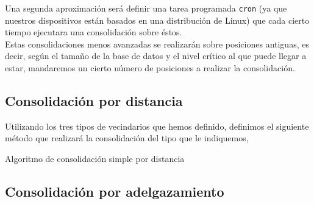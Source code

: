 \documentclass[a4paper, 12pt]{article}
\begin{document}
Una segunda aproximaci\'on ser\'a definir una tarea programada \texttt{cron} (ya que nuestros dispositivos est\'an basados en una distribuci\'on de Linux) que cada cierto tiempo ejecutara una consolidaci\'on sobre \'estos. \\

Estas consolidaciones menos avanzadas se realizar\'an sobre posiciones antiguas, es decir, seg\'un el tama\~no de la base de datos y el nivel cr\'itico al que puede llegar a estar, mandaremos un cierto n\'umero de posiciones a realizar la consolidaci\'on. \\

\pagebreak

\subsection{Consolidaci\'on por distancia}

Utilizando los tres tipos de vecindarios que hemos definido, definimos el siguiente m\'etodo que realizar\'a la consolidaci\'on del tipo que le indiquemos, 


\begin{algorithm}[h]\label{consolidationByDistance}
\begin{algorithmic}[1]
        \Else
        \EndIf
    \EndIf
        \Else
        \EndIf
    \EndIf
        \Else
        \EndIf
    \EndIf
\EndFor
\EndFunction
\end{algorithmic}
\caption{\label{alg:consolidationByDinstace} Algoritmo de consolidaci\'on simple por distancia}
\end{algorithm}

\pagebreak
\subsection{Consolidaci\'on por adelgazamiento}
\end{document}
